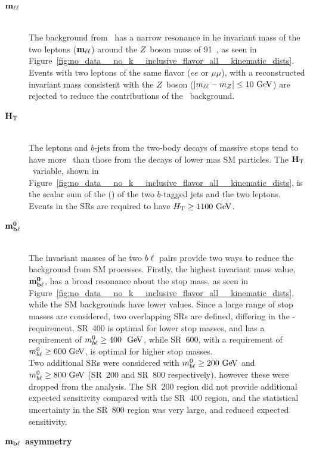 \begin{description}
  \item[$\mathbf{m_{\ell\ell}}$] \hfill \\
    The background from \ZGAMMAJETS\ has a narrow resonance in he invariant
    mass of the two leptons ($\mathbf{m_{\ell\ell}}$) around the $Z$~boson mass of
    91~\GeV, as seen in
    Figure~\ref{fig:no_data__no_k__inclusive_flavor_all__kinematic_dists}.
    Events with two leptons of the same flavor ($ee$ or $\mu\mu$), with a
    reconstructed invariant mass consistent with the $Z$~boson
    ($|m_{\ell\ell} - m_{Z}| \leq 10 \GeV$) are rejected to reduce the
    contributions of the \ZGAMMAJETS\ background.
  \item[$\mathbf{H_{\mathrm{T}}}$] \hfill \\
    The leptons and $b$-jets from the two-body decays of massive stops tend to
    have more \pt\ than those from the decays of lower mas SM particles.
    The $\mathbf{H_{\mathrm{T}}}$\ variable, shown in
    Figure~\ref{fig:no_data__no_k__inclusive_flavor_all__kinematic_dists},
    is the scalar sum of the \et(\pt) of the two $b$-tagged jets and the two
    leptons.
    Events in the SRs are required to have $\HT \geq 1100 \GeV$.
  \item[$\mathbf{m_{b\ell}^{0}}$] \hfill \\
    The invariant masses of he two $b\ell$ pairs provide two ways to reduce
    the background from SM processes.
    Firstly, the highest invariant mass value, $\mathbf{m_{b\ell}^{0}}$, has a broad
    resonance about the stop mass, as seen in
    Figure~\ref{fig:no_data__no_k__inclusive_flavor_all__kinematic_dists},
    while the SM backgrounds have lower values.
    Since a large range of stop masses are considered, two overlapping SRs are
    defined, differing in the \MBL-requirement.
    SR~400 is optimal for lower stop masses, and has a requirement of
    $\MBL^0 \geq 400~\GeV$, while SR~600, with a requirement of
    $\MBL^0 \geq 600 \GeV$, is optimal for higher stop masses.
    \\[1ex]
    Two additional SRs were considered with $\MBL^0 \geq 200 \GeV$ and
    $\MBL^0 \geq 800 \GeV$ (SR~200 and SR~800 respectively), however these
    were dropped from the analysis.
    The SR~200 region did not provide additional expected sensitivity compared
    with the SR~400 region, and the statistical uncertainty in the SR~800
    region was very large, and reduced expected sensitivity.
  \item[$\mathbf{m_{b\ell}}$~\textbf{asymmetry}] \hfill \\

\end{description}
